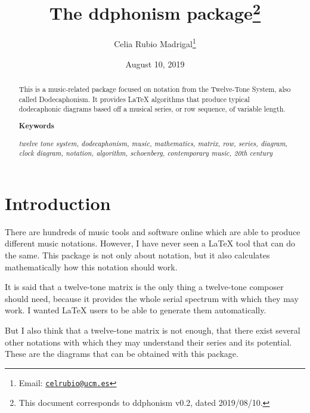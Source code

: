 \documentclass{article}
\title{The \textsf{ddphonism} package\footnote{This
		document corresponds to \textsf{ddphonism} v0.2, dated 2019/08/10.}}
\author{Celia Rubio Madrigal\footnote{Email: \href{mailto:celrubio@ucm.es}{\texttt{celrubio@ucm.es}}}}
\date{August 10, 2019}
\begin{document}
	
	\maketitle
	
	\begin{abstract}
		This is a music-related package focused on notation from the Twelve-Tone System, also called Dodecaphonism. It provides \LaTeX{} algorithms that produce typical dodecaphonic diagrams based off a musical series, or row sequence, of variable length.
		
		\begin{center}
			\textbf{Keywords}
		\end{center}
	
		\textit{twelve tone system, dodecaphonism, music, mathematics, matrix, row, series, diagram, clock diagram, notation, algorithm, schoenberg, contemporary music, 20th century}
	\end{abstract}


	\tableofcontents
	
	\section{Introduction}
	There are hundreds of music tools and software online which are able to produce different music notations. However, I have never seen a \LaTeX{} tool that can do the same. This package is not only about notation, but it also calculates mathematically how this notation should work.
	
	It is said that a twelve-tone matrix is the only thing a twelve-tone composer should need, because it provides the whole serial spectrum with which they may work. I wanted \LaTeX{} users to be able to generate them automatically.
	
	But I also think that a twelve-tone matrix is not enough, that there exist several other notations with which they may understand their series and its potential. These are the diagrams that can be obtained with this package.
	
	\begin{multicols}{2}
		
		
		
		
		\bigskip
	\end{multicols}
	
\end{document}
